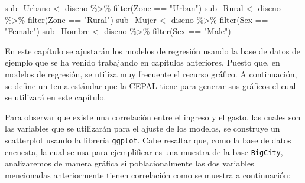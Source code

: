 \documentclass[
  12pt,
]{book}
\newenvironment{Shaded}{\begin{snugshade}}{\end{snugshade}}
\newcommand{\FunctionTok}[1]{\textcolor[rgb]{0.00,0.00,0.00}{#1}}
\newcommand{\NormalTok}[1]{#1}
\newcommand{\OtherTok}[1]{\textcolor[rgb]{0.56,0.35,0.01}{#1}}
\newcommand{\SpecialCharTok}[1]{\textcolor[rgb]{0.00,0.00,0.00}{#1}}
\newcommand{\StringTok}[1]{\textcolor[rgb]{0.31,0.60,0.02}{#1}}
\begin{document}
\begin{Shaded}
\begin{Highlighting}[]
\NormalTok{sub\_Urbano }\OtherTok{\textless{}{-}}\NormalTok{ diseno }\SpecialCharTok{\%\textgreater{}\%}  \FunctionTok{filter}\NormalTok{(Zone }\SpecialCharTok{==} \StringTok{"Urban"}\NormalTok{)}
\NormalTok{sub\_Rural  }\OtherTok{\textless{}{-}}\NormalTok{ diseno }\SpecialCharTok{\%\textgreater{}\%}  \FunctionTok{filter}\NormalTok{(Zone }\SpecialCharTok{==} \StringTok{"Rural"}\NormalTok{)}
\NormalTok{sub\_Mujer  }\OtherTok{\textless{}{-}}\NormalTok{ diseno }\SpecialCharTok{\%\textgreater{}\%}  \FunctionTok{filter}\NormalTok{(Sex }\SpecialCharTok{==} \StringTok{"Female"}\NormalTok{)}
\NormalTok{sub\_Hombre }\OtherTok{\textless{}{-}}\NormalTok{ diseno }\SpecialCharTok{\%\textgreater{}\%}  \FunctionTok{filter}\NormalTok{(Sex }\SpecialCharTok{==} \StringTok{"Male"}\NormalTok{)}
\end{Highlighting}
\end{Shaded}

En este capítulo se ajustarán los modelos de regresión usando la base de datos de ejemplo que se ha venido trabajando en capítulos anteriores. Puesto que, en modelos de regresión, se utiliza muy frecuente el recurso gráfico. A continuación, se define un tema estándar que la CEPAL tiene para generar sus gráficos el cual se utilizará en este capítulo.

Para observar que existe una correlación entre el ingreso y el gasto, las cuales son las variables que se utilizarán para el ajuste de los modelos, se construye un scatterplot usando la librería \texttt{ggplot}. Cabe resaltar que, como la base de datos encuesta, la cual se usa para ejemplificar es una muestra de la base \texttt{BigCity}, analizaremos de manera gráfica si poblacionalmente las dos variables mencionadas anteriormente tienen correlación como se muestra a continuación:
\end{document}
